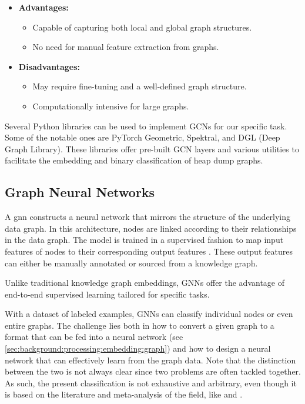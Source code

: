     \begin{itemize}
        \item \textbf{Advantages:}
        \begin{itemize}
            \item Capable of capturing both local and global graph structures.
            \item No need for manual feature extraction from graphs.
        \end{itemize}
        \item \textbf{Disadvantages:}
        \begin{itemize}
            \item May require fine-tuning and a well-defined graph structure.
            \item Computationally intensive for large graphs.
        \end{itemize}
    \end{itemize}

    Several Python libraries can be used to implement GCNs for our specific task. Some of the notable ones are PyTorch Geometric, Spektral, and DGL (Deep Graph Library). These libraries offer pre-built GCN layers and various utilities to facilitate the embedding and binary classification of heap dump graphs.

    \subsection{Graph Neural Networks}
    A \acrfull{gnn} constructs a neural network that mirrors the structure of the underlying data graph. In this architecture, nodes are linked according to their relationships in the data graph. The model is trained in a supervised fashion to map input features of nodes to their corresponding output features \cite{KG22}. These output features can either be manually annotated or sourced from a knowledge graph. 

    Unlike traditional knowledge graph embeddings, GNNs offer the advantage of end-to-end supervised learning tailored for specific tasks. 
    
    With a dataset of labeled examples, GNNs can classify individual nodes or even entire graphs. The challenge lies both in how to convert a given graph to a format that can be fed into a neural network (see \autoref{sec:background:processing:embedding:graph}) and how to design a neural network that can effectively learn from the graph data. Note that the distinction between the two is not always clear since two problems are often tackled together. As such, the present classification is not exhaustive and arbitrary, even though it is based on the literature and meta-analysis of the field, like  \cite{KG22} and  \cite{GNNComprehensiveSurvey20}.
    
